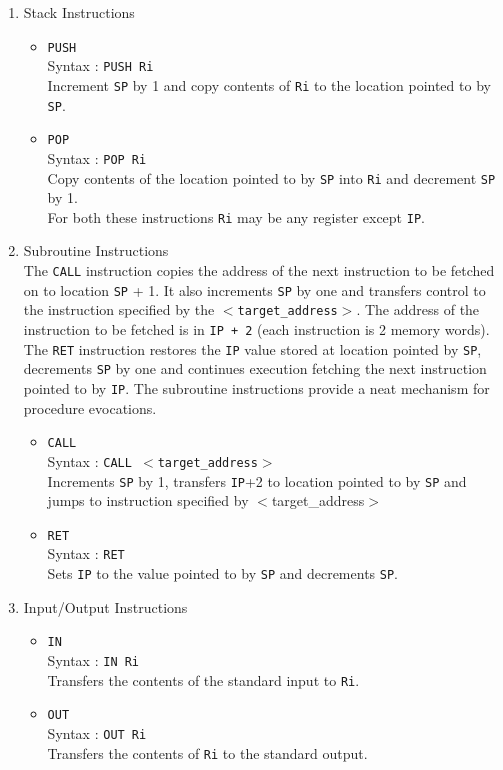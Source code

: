 \documentclass[11pt]{report}
\begin{document}
\begin{enumerate}
\begin{itemize}
\end{itemize}

\item Stack Instructions
\begin{itemize}
\item \texttt{PUSH}\\
Syntax : \texttt{PUSH Ri}\\
Increment \texttt{SP} by 1 and copy contents of \texttt{Ri} to the location pointed to by \texttt{SP}.
\item \texttt{POP}\\
Syntax : \texttt{POP Ri}\\
Copy contents of the location pointed to by \texttt{SP} into \texttt{Ri} and decrement \texttt{SP} by 1.\\
For both these instructions \texttt{Ri} may be any register except \texttt{IP}.
\end{itemize}

\item Subroutine Instructions\\
The \texttt{CALL} instruction copies the address of the next instruction to be fetched on to location \texttt{SP} + 1. It also increments \texttt{SP} by one and transfers control to the instruction specified by the \texttt{$<$target\_address$>$}. The address of the instruction to be fetched is in \texttt{IP + 2} (each instruction is 2 memory words). The \texttt{RET} instruction restores the \texttt{IP} value stored at location pointed by \texttt{SP}, decrements \texttt{SP} by one and continues execution fetching the next instruction pointed to by \texttt{IP}. The subroutine instructions provide a neat mechanism for procedure evocations.
\begin{itemize}
\item \texttt{CALL}\\
Syntax : \texttt{CALL $<$target\_address$>$}\\
Increments \texttt{SP} by 1, transfers \texttt{IP}+2 to location pointed to by \texttt{SP} and jumps to instruction specified by $<$target\_address$>$
\item \texttt{RET}\\
Syntax : \texttt{RET}\\
Sets \texttt{IP} to the value pointed to by \texttt{SP} and decrements \texttt{SP}.
\end{itemize}

\item Input/Output Instructions
\begin{itemize}
\item \texttt{IN}\\
Syntax : \texttt{IN Ri}\\
Transfers the contents of the standard input to \texttt{Ri}.
\item \texttt{OUT}\\
Syntax : \texttt{OUT Ri}\\
Transfers the contents of \texttt{Ri} to the standard output.\\
\end{itemize}



\end{enumerate}
\end{document}
